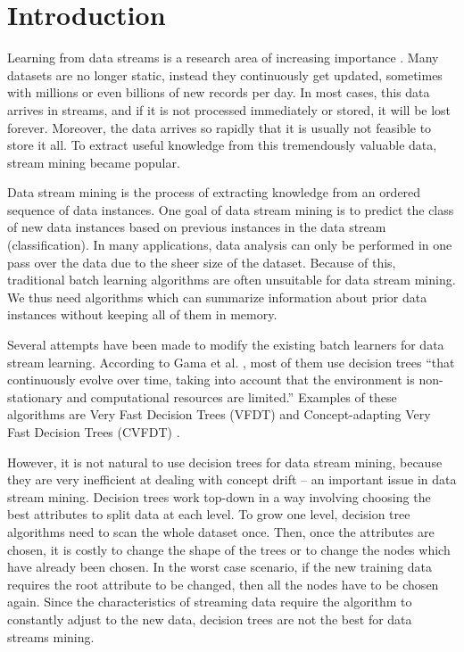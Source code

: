 \documentclass[conference]{IEEEtran}
\begin{document}
		\IEEEpeerreviewmaketitle
		
		\section{Introduction}
		\label{sec:introduction}
		
		Learning from data streams is a research area of increasing importance \cite{evaluation_stream_mining}. Many datasets are no longer static, instead they continuously get updated, sometimes with millions or even billions of new records per day. In most cases, this data arrives in streams, and if it is not processed immediately or stored, it will be lost forever. Moreover, the data arrives so rapidly that it is usually not feasible to store it all. To extract useful knowledge from this tremendously valuable data, stream mining became popular.
		
		Data stream mining is the process of extracting knowledge from an ordered sequence of data instances. One goal of data stream mining is to predict the class of new data instances based on previous instances in the data stream (classification). In many applications, data analysis can only be performed in one pass over the data due to the sheer size of the dataset. Because of this, traditional batch learning algorithms are often unsuitable for data stream mining.  We thus need algorithms which can summarize information about prior data instances without keeping all of them in memory.  
		
		Several attempts have been made to modify the existing batch learners for data stream learning. According to Gama et al. \cite{evaluation_stream_mining}, most of them use decision trees ``that continuously evolve over time, taking into account that the environment is non-stationary and computational resources are limited.'' Examples of these algorithms are Very Fast Decision Trees (VFDT) \cite{VFDT} and Concept-adapting Very Fast Decision Trees (CVFDT) \cite{CVFDT}.

		However, it is not natural to use decision trees for data stream mining, because they are very inefficient at dealing with concept drift -- an important issue in data stream mining. Decision trees work top-down in a way involving choosing the best attributes to split data at each level. To grow one level, decision tree algorithms need to scan the whole dataset once. Then, once the attributes are chosen, it is costly to change the shape of the trees or to change the nodes which have already been chosen. In the worst case scenario, if the new training data requires the root attribute to be changed, then all the nodes have to be chosen again. Since the characteristics of streaming data require the algorithm to constantly adjust to the new data, decision trees are not the best for data streams mining. 
		
\end{document}
